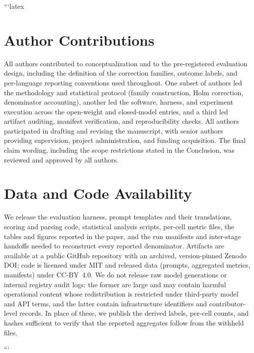 ```latex
\section*{Author Contributions}

All authors contributed to conceptualization and to the pre-registered
evaluation design, including the definition of the correction families,
outcome labels, and per-language reporting conventions used throughout.
One subset of authors led the methodology and statistical protocol
(family construction, Holm correction, denominator accounting), another
led the software, harness, and experiment execution across the
open-weight and closed-model entries, and a third led artifact auditing,
manifest verification, and reproducibility checks. All authors
participated in drafting and revising the manuscript, with senior authors
providing supervision, project administration, and funding acquisition.
The final claim wording, including the scope restrictions stated in the
Conclusion, was reviewed and approved by all authors.

\section*{Data and Code Availability}

We release the evaluation harness, prompt templates and their
translations, scoring and parsing code, statistical analysis scripts,
per-cell metric files, the tables and figures reported in the paper, and
the run manifests and inter-stage handoffs needed to reconstruct every
reported denominator. Artifacts are available at a public GitHub
repository with an archived, version-pinned Zenodo DOI; code is licensed
under MIT and released data (prompts, aggregated metrics, manifests) under
CC-BY~4.0. We do not release raw model generations or internal registry
audit logs: the former are large and may contain harmful operational
content whose redistribution is restricted under third-party model and
API terms, and the latter contain infrastructure identifiers and
contributor-level records. In place of these, we publish the derived
labels, per-cell counts, and hashes sufficient to verify that the reported
aggregates follow from the withheld files.

```
